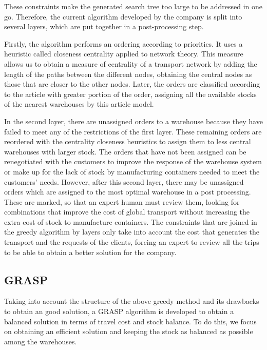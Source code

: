 \documentclass[letterpaper]{article} %
\begin{document}
These constraints make the generated search tree too large to be addressed in one go. Therefore, the current algorithm developed by the company is split into several layers, which are put together in a post-processing step.

 Firstly, the algorithm performs an ordering according to priorities. It uses a heuristic called closeness centrality applied to network theory. This measure allows us to obtain a measure of centrality of a transport network by adding the length of the paths between the different nodes, obtaining the central nodes as those that are closer to the other nodes. Later, the orders are classified according to the article with greater portion of the order, assigning all the available stocks of the nearest warehouses by this article model.

In the second layer, there are unassigned orders to a warehouse because they have failed to meet any of the restrictions of the first layer. These remaining orders are reordered with the centrality closeness heuristics to assign them to less central warehouses with larger stock. The orders that have not been assigned can be renegotiated with the customers to improve the response of the warehouse system or make up for the lack of stock by manufacturing containers needed to meet the customers' needs. However, after this second layer, there may be unassigned orders which are assigned to the most optimal warehouse in a post processing. These are marked, so that an expert human must review them, looking for combinations that improve the cost of global transport without increasing the extra cost of stock to manufacture containers.
The constraints that are joined in the greedy algorithm by layers only take into account the cost that generates the transport and the requests of the clients, forcing an expert to review all the trips to be able to obtain a better solution for the company.

\subsection*{GRASP}

Taking into account the structure of the above greedy method and its drawbacks to obtain an good solution, a GRASP algorithm is developed to obtain a balanced solution in terms of travel cost and stock balance. To do this, we focus on obtaining an efficient solution and keeping the stock as balanced as possible among the warehouses.
\end{document}
